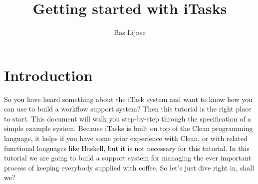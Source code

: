 \documentclass[a4paper,11pt]{article}
\title{Getting started with iTasks}
\author{Bas Lijnse}
\begin{document}
\maketitle
\section{Introduction}
So you have heard something about the iTask system and want to know how you can use to build a workflow support system? Then this tutorial is the right place to start. This document will walk you step-by-step through the specification of a simple example system. Because iTasks is built on top of the Clean programming language, it helps if you have some prior experience with Clean, or with related functional languages like Haskell, but it is not necessary for this tutorial. In this tutorial we are going to build a support system for managing the ever important process of keeping everybody supplied with coffee. So let's just dive right in, shall we?
\end{document}
